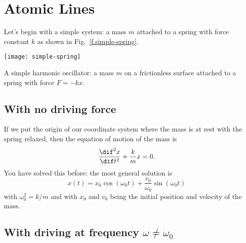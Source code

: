 \newcommand*{\DDtt}[1]{\frac{\dif^{2} #1}{\dif t^{2}}}
\newcommand*{\wt}{\omega t}
\newcommand*{\wot}{\omega_{0} t}
\newcommand*{\wmt}{\omega_{m} t}
\newcommand*{\womw}{(\omega_{0}^{2}-\omega^{2})}
\newcommand*{\gw}{\Gamma^{2}\omega^{2}}

\nocite{Mihalas1978Stellar-Atmosph,LeBlanc2010An-Introduction,Carroll2006An-Introduction}

\section{Atomic Lines}

Let's begin with a simple system: a mass $m$ attached to a spring with force constant $k$ as shown in Fig.~\ref{f.simple-spring}.

\begin{marginfigure}[-8\baselineskip]
\texttt{[image: simple-spring]}
\caption[A simple harmonic oscillator]{A simple harmonic oscillator: a mass $m$ on a frictionless surface attached to a  spring with force $F = -kx$.
\label{f.simple-spring}}
\end{marginfigure}

\subsection{With no driving force}

If we put the origin of our coordinate system where the mass is at rest with the spring relaxed, then the equation of motion of the mass is
\begin{equation}\label{e.SHO-basic}
	\DDtt{x} + \frac{k}{m} x = 0.
\end{equation}
You have solved this before: the most general solution is
\begin{equation}\label{e.SHO-general-solution}
	x(t) = x_{0}\cos(\wot) + \frac{v_{0}}{\omega_{0}}\sin(\wot)
\end{equation}
with $\omega_{0}^{2} = k/m$ and with $x_{0}$ and $v_{0}$ being the initial position and velocity of the mass.

\subsection{With driving at frequency $\omega \neq \omega_{0}$}

